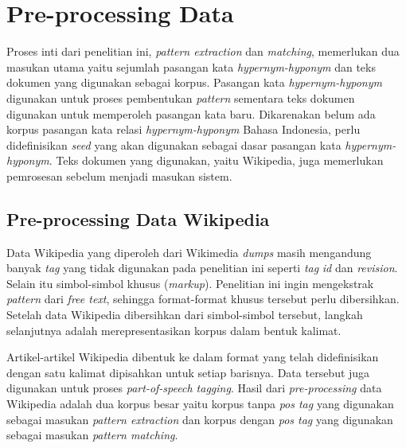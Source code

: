 \section{Pre-processing Data}
Proses inti dari penelitian ini, \textit{pattern extraction} dan \textit{matching}, memerlukan dua masukan utama yaitu sejumlah pasangan kata \textit{hypernym-hyponym} dan teks dokumen yang digunakan sebagai korpus. Pasangan kata \textit{hypernym-hyponym} digunakan untuk proses pembentukan \textit{pattern} sementara teks dokumen digunakan untuk memperoleh pasangan kata baru. Dikarenakan belum ada korpus pasangan kata relasi \textit{hypernym-hyponym} Bahasa Indonesia, perlu didefinisikan \textit{seed} yang akan digunakan sebagai dasar pasangan kata \textit{hypernym-hyponym}. Teks dokumen yang digunakan, yaitu Wikipedia, juga memerlukan pemrosesan sebelum menjadi masukan sistem.

\subsection{Pre-processing Data Wikipedia}
Data Wikipedia yang diperoleh dari Wikimedia \textit{dumps} masih mengandung banyak \textit{tag} yang tidak digunakan pada penelitian ini seperti \textit{tag} \textit{id} dan \textit{revision}. Selain itu simbol-simbol khusus (\textit{markup}). Penelitian ini ingin mengekstrak \textit{pattern} dari \textit{free text}, sehingga format-format khusus tersebut perlu dibersihkan. Setelah data Wikipedia dibersihkan dari simbol-simbol tersebut, langkah selanjutnya adalah merepresentasikan korpus dalam bentuk kalimat. 

Artikel-artikel Wikipedia dibentuk ke dalam format yang telah didefinisikan dengan satu kalimat dipisahkan untuk setiap barisnya. Data tersebut juga digunakan untuk proses \textit{part-of-speech tagging}. Hasil dari \textit{pre-processing} data Wikipedia adalah dua korpus besar yaitu korpus tanpa \textit{pos tag} yang digunakan sebagai masukan \textit{pattern extraction} dan korpus dengan \textit{pos tag} yang digunakan sebagai masukan \textit{pattern matching}. 

